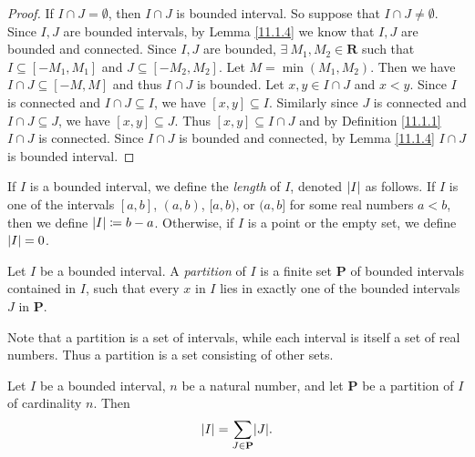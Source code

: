 \begin{proof}
    If \(I \cap J = \emptyset\), then \(I \cap J\) is bounded interval.
    So suppose that \(I \cap J \neq \emptyset\).
    Since \(I, J\) are bounded intervals, by Lemma \ref{11.1.4} we know that \(I, J\) are bounded and connected.
    Since \(I, J\) are bounded, \(\exists\ M_1, M_2 \in \mathbf{R}\) such that \(I \subseteq [-M_1, M_1]\) and \(J \subseteq [-M_2, M_2]\).
    Let \(M = \min(M_1, M_2)\).
    Then we have \(I \cap J \subseteq [-M, M]\) and thus \(I \cap J\) is bounded.
    Let \(x, y \in I \cap J\) and \(x < y\).
    Since \(I\) is connected and \(I \cap J \subseteq I\), we have \([x, y] \subseteq I\).
    Similarly since \(J\) is connected and \(I \cap J \subseteq J\), we have \([x, y] \subseteq J\).
    Thus \([x, y] \subseteq I \cap J\) and by Definition \ref{11.1.1} \(I \cap J\) is connected.
    Since \(I \cap J\) is bounded and connected, by Lemma \ref{11.1.4} \(I \cap J\) is bounded interval.
\end{proof}

\setcounter{theorem}{7}
\begin{definition}\label{11.1.8}
    If \(I\) is a bounded interval, we define the \emph{length} of \(I\), denoted \(\abs*{I}\) as follows.
    If \(I\) is one of the intervals \([a, b]\), \((a, b)\), \([a, b)\), or \((a, b]\) for some real numbers \(a < b\), then we define \(\abs*{I} \coloneqq b - a\).
    Otherwise, if \(I\) is a point or the empty set, we define \(\abs*{I} = 0\).
\end{definition}

\setcounter{theorem}{9}
\begin{definition}[Partitions]\label{11.1.10}
    Let \(I\) be a bounded interval.
    A \emph{partition} of \(I\) is a finite set \(\mathbf{P}\) of bounded intervals contained in \(I\), such that every \(x\) in \(I\) lies in exactly one of the bounded intervals \(J\) in \(\mathbf{P}\).
\end{definition}

\begin{remark}\label{11.1.11}
    Note that a partition is a set of intervals, while each interval is itself a set of real numbers.
    Thus a partition is a set consisting of other sets.
\end{remark}

\setcounter{theorem}{12}
\begin{theorem}\label{11.1.13}
    Let \(I\) be a bounded interval, \(n\) be a natural number, and let \(\mathbf{P}\) be a partition of \(I\) of cardinality \(n\).
    Then
    \[
        \abs*{I} = \sum_{J \in \mathbf{P}} \abs*{J}.
    \]
\end{theorem}

